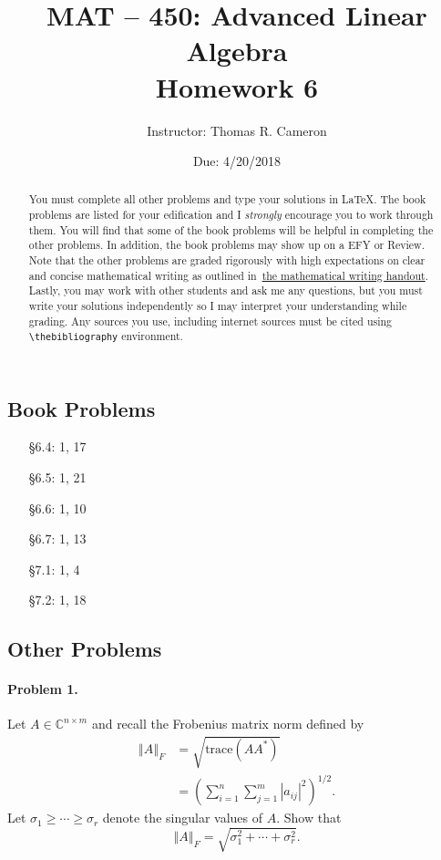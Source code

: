 \documentclass{article}
\title{MAT -- 450: Advanced Linear Algebra\\
\large{Homework 6}}
\author{Instructor: Thomas R. Cameron}
\date{Due: 4/20/2018}
\begin{document}
\maketitle

\begin{abstract}
You must complete all other problems and type your solutions in \LaTeX. The book problems are listed for your edification and I \emph{strongly} encourage you to work through them. You will find that some of the book problems will be helpful in completing the other problems. In addition, the book problems may show up on a EFY or Review. Note that the other problems are graded rigorously with high expectations on clear and concise mathematical writing as outlined in~\href{https://www.thomasrcameron.com/courses/MAT-450/handouts/math_writing.pdf}{the mathematical writing handout}. Lastly, you may work with other students and ask me any questions, but you must write your solutions independently so I may interpret your understanding while grading. Any sources you use, including internet sources must be cited using {\verb+\thebibliography+} environment. 
\end{abstract}

\subsection*{Book Problems}
\begin{itemize}
\item   [\S 6.4:] 1, 17
\item   [\S 6.5:] 1, 21
\item   [\S 6.6:] 1, 10
\item	  [\S 6.7:] 1, 13
\item	  [\S 7.1:] 1, 4 
\item	  [\S 7.2:] 1, 18
\end{itemize}

\subsection*{Other Problems} 

\paragraph*{Problem 1.} Let $A\in\mathbb{C}^{n\times m}$ and recall the Frobenius matrix norm defined by
\begin{align*}
\left\Vert A\right\Vert_{F} &= \sqrt{\text{trace}\left(AA^{*}\right)} \\
&= \left(\sum_{i=1}^{n}\sum_{j=1}^{m}|a_{ij}|^{2}\right)^{1/2}.
\end{align*}
Let $\sigma_{1}\geq\cdots\geq\sigma_{r}$ denote the singular values of $A$. Show that 
\[
\left\Vert A\right\Vert_{F}=\sqrt{\sigma_{1}^{2}+\cdots+\sigma_{r}^{2}}.
\]
\end{document}
